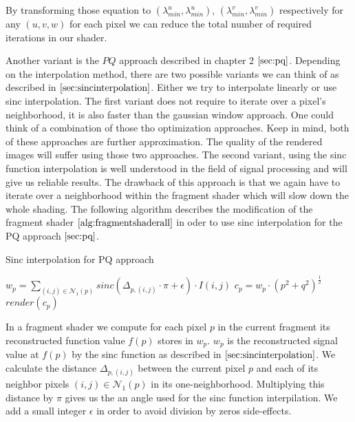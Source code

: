 By transforming those equation to $(\lambda_{min}^{u}, \lambda_{min}^{u})$, $(\lambda_{min}^{v}, \lambda_{min}^{v})$ respectively for any $(u,v,w)$ for each pixel we can reduce the total number of required iterations in our shader.  

Another variant is the $PQ$ approach described in chapter 2 $\ref{sec:pq}$. Depending on the interpolation method, there are two possible variants we can think of as described in $\ref{sec:sincinterpolation}$. Either we try to interpolate linearly or use sinc interpolation.
The first variant does not require to iterate over a pixel's neighborhood, it is also faster than the gaussian window approach. One could think of a combination of those tho optimization approaches. Keep in mind, both of these approaches are further approximation. The quality of the rendered images will suffer using those two approaches. The second variant, using the sinc function interpolation is well understood in the field of signal processing and will give us reliable results. The drawback of this approach is that we again have to iterate over a neighborhood within the fragment shader which will slow down the whole shading. The following algorithm describes the modification of the fragment shader  $\ref{alg:fragmentshaderall}$ in oder to use sinc interpolation for the PQ approach $\ref{sec:pq}$.  

\begin{algorithm}[H]
  \caption{Sinc interpolation for PQ approach}
  \begin{algorithmic}
      \State $w_p = \sum_{(i,j) \in \mathcal{N}_{1}(p)} sinc(\Delta_{p,(i,j)} \cdot \pi + \epsilon) \cdot I(i,j)$
      \State $c_p = w_p \cdot (p^2 + q^2)^{\frac{1}{2}}$
      \State $render(c_p)$
    \EndFor
  \end{algorithmic}
  \label{alg:sincinterpolation}
\end{algorithm}

In a fragment shader we compute for each pixel $p$ in the current fragment its reconstructed function value $f(p)$ stores in $w_p$. $w_p$ is the reconstructed signal value at $f(p)$ by the sinc function as described in $\ref{sec:sincinterpolation}$.
We calculate the distance $\Delta_{p,(i,j)}$ between the current pixel $p$ and each of its neighbor pixels $(i,j) \in \mathcal{N}_{1}(p)$ in its one-neighborhood. Multiplying this distance by $\pi$ gives us the an angle used for the sinc function interpilation. We add a small integer $\epsilon$ in order to avoid division by zeros side-effects.

